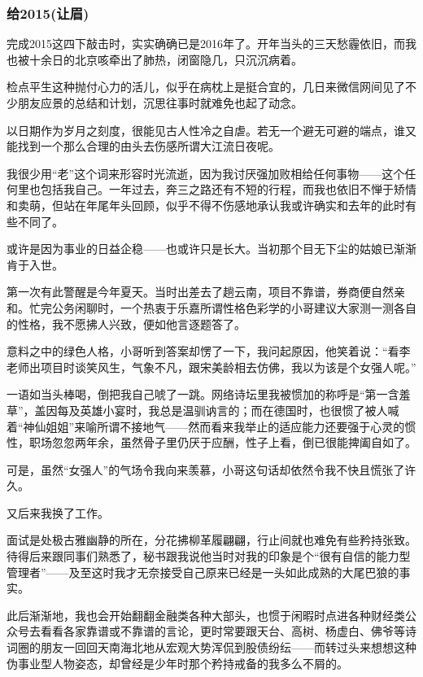 \documentclass[11pt]{article}
\begin{document}
\subsubsection*{给2015(让眉)}
\label{sec:orgheadline9}
完成2015这四下敲击时，实实确确已是2016年了。开年当头的三天愁霾依旧，而我也被十余日的北京咳牵出了肺热，闭窗隐几，只沉沉病着。

检点平生这种抛付心力的活儿，似乎在病枕上是挺合宜的，几日来微信网间见了不少朋友应景的总结和计划，沉思往事时就难免也起了动念。

以日期作为岁月之刻度，很能见古人性冷之自虐。若无一个避无可避的端点，谁又能找到一个那么合理的由头去伤感所谓大江流日夜呢。



我很少用“老”这个词来形容时光流逝，因为我讨厌强加败相给任何事物——这个任何里也包括我自己。一年过去，奔三之路还有不短的行程，而我也依旧不惮于矫情和卖萌，但站在年尾年头回顾，似乎不得不伤感地承认我或许确实和去年的此时有些不同了。

或许是因为事业的日益企稳——也或许只是长大。当初那个目无下尘的姑娘已渐渐肯于入世。

第一次有此警醒是今年夏天。当时出差去了趟云南，项目不靠谱，券商便自然亲和。忙完公务闲聊时，一个热衷于乐嘉所谓性格色彩学的小哥建议大家测一测各自的性格，我不愿拂人兴致，便如他言逐题答了。

意料之中的绿色人格，小哥听到答案却愣了一下，我问起原因，他笑着说：“看李老师出项目时谈笑风生，气象不凡，跟宋美龄相去仿佛，我以为该是个女强人呢。”

一语如当头棒喝，倒把我自己唬了一跳。网络诗坛里我被惯加的称呼是“第一含羞草”，盖因每及英雄小宴时，我总是温驯讷言的；而在德国时，也很惯了被人喊着“神仙姐姐”来喻所谓不接地气——然而看来我举止的适应能力还要强于心灵的惯性，职场忽忽两年余，虽然骨子里仍厌于应酬，性子上看，倒已很能捭阖自如了。

可是，虽然“女强人”的气场令我向来羡慕，小哥这句话却依然令我不快且慌张了许久。

又后来我换了工作。

面试是处极古雅幽静的所在，分花拂柳革履翩翩，行止间就也难免有些矜持张致。待得后来跟同事们熟悉了，秘书跟我说他当时对我的印象是个“很有自信的能力型管理者”——及至这时我才无奈接受自己原来已经是一头如此成熟的大尾巴狼的事实。

此后渐渐地，我也会开始翻翻金融类各种大部头，也惯于闲暇时点进各种财经类公众号去看看各家靠谱或不靠谱的言论，更时常要跟天台、高树、杨虚白、佛爷等诗词圈的朋友一回回天南海北地从宏观大势浑侃到股债纷纭——而转过头来想想这种伪事业型人物姿态，却曾经是少年时那个矜持戒备的我多么不屑的。
\end{document}

